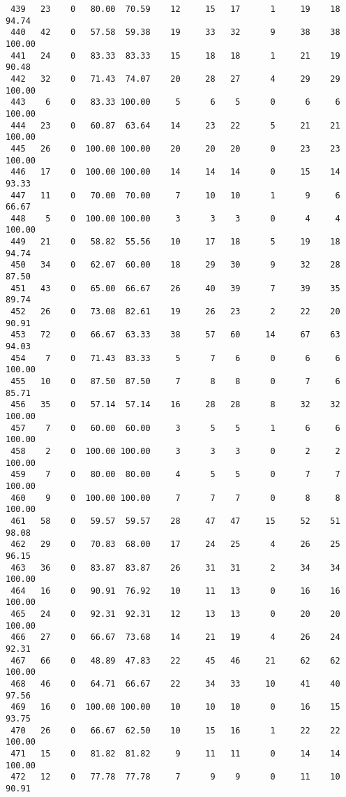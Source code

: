 \begin{verbatim}
 439   23    0   80.00  70.59    12     15   17      1     19    18    94.74
 440   42    0   57.58  59.38    19     33   32      9     38    38   100.00
 441   24    0   83.33  83.33    15     18   18      1     21    19    90.48
 442   32    0   71.43  74.07    20     28   27      4     29    29   100.00
 443    6    0   83.33 100.00     5      6    5      0      6     6   100.00
 444   23    0   60.87  63.64    14     23   22      5     21    21   100.00
 445   26    0  100.00 100.00    20     20   20      0     23    23   100.00
 446   17    0  100.00 100.00    14     14   14      0     15    14    93.33
 447   11    0   70.00  70.00     7     10   10      1      9     6    66.67
 448    5    0  100.00 100.00     3      3    3      0      4     4   100.00
 449   21    0   58.82  55.56    10     17   18      5     19    18    94.74
 450   34    0   62.07  60.00    18     29   30      9     32    28    87.50
 451   43    0   65.00  66.67    26     40   39      7     39    35    89.74
 452   26    0   73.08  82.61    19     26   23      2     22    20    90.91
 453   72    0   66.67  63.33    38     57   60     14     67    63    94.03
 454    7    0   71.43  83.33     5      7    6      0      6     6   100.00
 455   10    0   87.50  87.50     7      8    8      0      7     6    85.71
 456   35    0   57.14  57.14    16     28   28      8     32    32   100.00
 457    7    0   60.00  60.00     3      5    5      1      6     6   100.00
 458    2    0  100.00 100.00     3      3    3      0      2     2   100.00
 459    7    0   80.00  80.00     4      5    5      0      7     7   100.00
 460    9    0  100.00 100.00     7      7    7      0      8     8   100.00
 461   58    0   59.57  59.57    28     47   47     15     52    51    98.08
 462   29    0   70.83  68.00    17     24   25      4     26    25    96.15
 463   36    0   83.87  83.87    26     31   31      2     34    34   100.00
 464   16    0   90.91  76.92    10     11   13      0     16    16   100.00
 465   24    0   92.31  92.31    12     13   13      0     20    20   100.00
 466   27    0   66.67  73.68    14     21   19      4     26    24    92.31
 467   66    0   48.89  47.83    22     45   46     21     62    62   100.00
 468   46    0   64.71  66.67    22     34   33     10     41    40    97.56
 469   16    0  100.00 100.00    10     10   10      0     16    15    93.75
 470   26    0   66.67  62.50    10     15   16      1     22    22   100.00
 471   15    0   81.82  81.82     9     11   11      0     14    14   100.00
 472   12    0   77.78  77.78     7      9    9      0     11    10    90.91

\end{verbatim}
